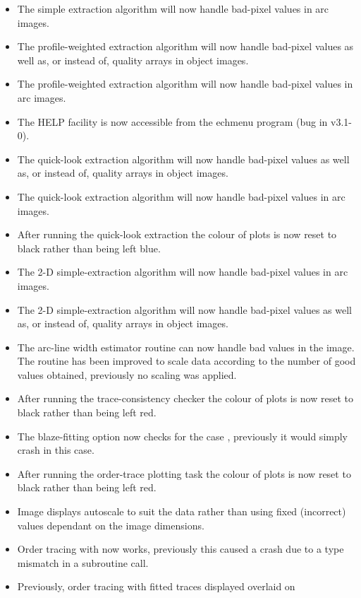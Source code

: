 \documentclass[twoside,11pt,nolof]{starlink}
\begin{document}
\begin{itemize}
\item The simple extraction algorithm will now handle bad-pixel values in
   arc images.
\item The profile-weighted extraction algorithm will now handle bad-pixel
   values as well as, or instead of, quality arrays in object images.
\item The profile-weighted extraction algorithm will now handle bad-pixel
   values in arc images.
\item The HELP facility is now accessible from the echmenu program (bug in
   v3.1-0).
\item The quick-look extraction algorithm will now handle bad-pixel
   values as well as, or instead of, quality arrays in object images.
\item The quick-look extraction algorithm will now handle bad-pixel
   values in arc images.
\item After running the quick-look extraction the colour of plots is now
   reset to black rather than being left blue.
\item The 2-D simple-extraction algorithm will now handle bad-pixel values
   in arc images.
\item The 2-D simple-extraction algorithm will now handle bad-pixel values
   as well as, or instead of, quality arrays in object images.
\item The arc-line width estimator routine can now handle bad values in the
   image.  The routine has been improved to scale data according to the
   number of good values obtained, previously no scaling was applied.
\item After running the trace-consistency checker the colour of plots is
   now reset to black rather than being left red.
\item The blaze-fitting option now checks for the case
   ,
   previously it would simply crash in this case.
\item After running the order-trace plotting task the colour of plots is
   now reset to black rather than being left red.
\item Image displays autoscale to suit the data rather than using fixed
   (incorrect) values dependant on the image dimensions.
\item Order tracing with  now works,
   previously this caused
   a crash due to a type mismatch in a subroutine call.
\item Previously, order tracing with fitted traces displayed overlaid on

\end{itemize}
\end{document}
